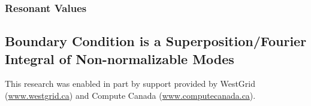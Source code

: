 \documentclass[letterpaper,11pt]{article}
\begin{document}
\subsubsection{Resonant Values}

\subsection{Boundary Condition is a Superposition/Fourier Integral of Non-normalizable Modes}

\acknowledgments

This research was enabled in part by support provided by WestGrid (\href{www.westgrid.ca}{www.westgrid.ca}) and Compute Canada (\href{www.computecanada.ca}{www.computecanada.ca}).



%

\end{document}
